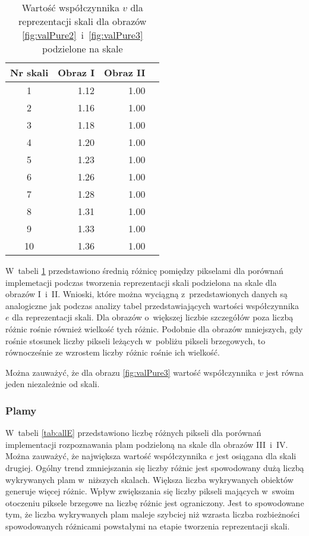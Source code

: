 \begin{center}
\begin{table}
\centering
\caption{Wartość współczynnika $ v $ dla reprezentacji skali dla obrazów \ref{fig:valPure2}~i~\ref{fig:valPure3} podzielone na skale}
\label{tab:allV}
\begin{tabular}{|c|r|r|r|}
\hline
Nr skali & Obraz I  &  Obraz II\\ \hline
1        & 1.12     & 1.00\\ \hline
2        & 1.16     & 1.00\\ \hline
3        & 1.18     & 1.00\\ \hline
4        & 1.20     & 1.00\\ \hline
5        & 1.23     & 1.00\\ \hline
6        & 1.26     & 1.00\\ \hline
7        & 1.28     & 1.00\\ \hline
8        & 1.31     & 1.00\\ \hline
9        & 1.33     & 1.00\\ \hline
10       & 1.36     & 1.00\\ \hline
\end{tabular}
\end{table}
\end{center}

W~tabeli \ref{tab:allV} przedstawiono średnią różnicę pomiędzy pikselami dla porównań implemetacji podczas tworzenia reprezentacji skali podzielona na skale dla obrazów I~i~II. Wnioski, które można wyciągną z~przedstawionych danych są analogiczne jak podczas analizy tabel przedstawiających wartości współczynnika $ e $ dla reprezentacji skali. Dla obrazów o~większej liczbie szczegółów poza liczbą różnic rośnie również wielkość tych różnic. Podobnie dla obrazów mniejszych, gdy rośnie stosunek liczby pikseli leżących w~pobliżu pikseli brzegowych, to równocześnie ze wzrostem liczby różnic rośnie ich wielkość.

Można zauważyć, że dla obrazu \ref{fig:valPure3} wartość współczynnika $ v $ jest równa jeden niezależnie od skali.

\subsubsection{Plamy}
\label{subsubsec:plamyTabele}

W~tabeli \ref{tab:allE} przedstawiono liczbę różnych pikseli dla porównań implementacji rozpoznawania plam podzieloną na skale dla obrazów III~i~IV. Można zauważyć, że największa wartość współczynnika $ e $ jest osiągana dla skali drugiej. Ogólny trend zmniejszania się liczby różnic jest spowodowany dużą liczbą wykrywanych plam w~niższych skalach. Większa liczba wykrywanych obiektów generuje więcej różnic. Wpływ zwiększania się liczby pikseli mających w~swoim otoczeniu piksele brzegowe na liczbę różnic jest ograniczony. Jest to spowodowane tym, że liczba wykrywanych plam maleje szybciej niż wzrasta liczba rozbieżności spowodowanych różnicami powstałymi na etapie tworzenia reprezentacji skali.

